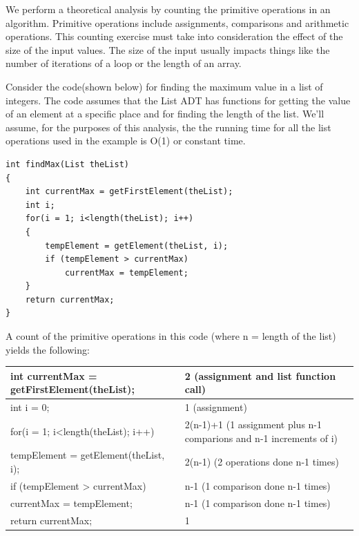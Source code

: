 We perform a theoretical analysis by counting the primitive operations in an algorithm.  Primitive operations include assignments, comparisons and arithmetic operations.     This counting exercise must take into consideration the effect of the size of the input values.  The size of the input usually  impacts things like the number of iterations of a loop or the length of an array.

Consider the code(shown below)  for finding the maximum value in a list of integers.    The code assumes that the List ADT has functions for getting the value of an element at a specific place and for finding the length of the list.   We'll assume, for the purposes of this analysis,  the the running time for all the list operations used in the example is O(1) or constant time.

\begin{lstlisting}
int findMax(List theList)
{
    int currentMax = getFirstElement(theList);
    int i;
    for(i = 1; i<length(theList); i++)
    {
    	tempElement = getElement(theList, i);
        if (tempElement > currentMax)
            currentMax = tempElement;
    }
    return currentMax;
}
\end{lstlisting}

A count of the primitive operations in this code (where n = length of the list) yields the following:

\begin{table}[H]
\begin{tabular}{l || l}
    int currentMax = getFirstElement(theList); & 2 (assignment and list function call)\\ \hline
    int i = 0; & 1 (assignment)\\ \hline
    for(i = 1; i<length(theList); i++) & 2(n-1)+1 (1 assignment plus n-1 comparions and n-1 increments of i)\\ \hline

    	tempElement = getElement(theList, i);  &  2(n-1) (2 operations done n-1 times)\\ \hline
        if (tempElement > currentMax) & n-1 (1 comparison done n-1 times)\\ \hline
            currentMax = tempElement; & n-1 (1 comparison done n-1 times)\\ \hline

   return currentMax; & 1 \\ \hline
\end{tabular}
\end{table}

